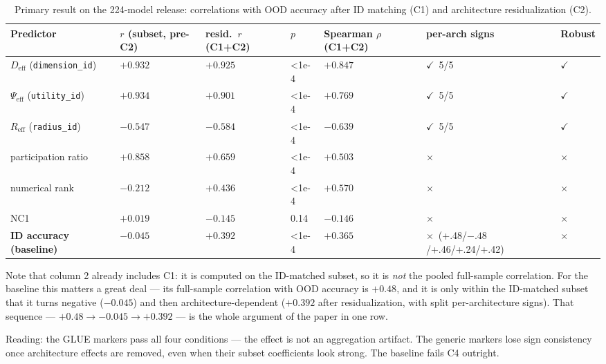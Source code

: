 \documentclass[10pt]{article} %
\newcommand{\okmark}{\ensuremath{\checkmark}}
\newcommand{\nomark}{\ensuremath{\times}}
\begin{document}
\begin{table}[t]
\caption{Primary result on the 224-model release: correlations with OOD accuracy after ID matching (C1) and architecture residualization (C2).}
\label{tab:primary}
\centering
\small
\setlength{\tabcolsep}{4pt}
\begin{tabular}{@{}p{3.05cm}p{1.75cm}p{1.75cm}p{0.90cm}p{2.35cm}p{3.75cm}p{1.25cm}@{}}
\hline
Predictor & $r$ (subset, pre-C2) & resid.\ $r$ (C1+C2) & $p$ & Spear\allowbreak man $\rho$ (C1+C2) & per-arch signs & Robust \\
\hline
$D_{\mathrm{eff}}$ (\texttt{dimension\_id}) & $+0.932$ & \textbf{$+0.925$} & <1e-4 & \textbf{$+0.847$} & \okmark\ 5/5 & \textbf{\okmark} \\
\hline
$\Psi_{\mathrm{eff}}$ (\texttt{utility\_id}) & $+0.934$ & \textbf{$+0.901$} & <1e-4 & $+0.769$ & \okmark\ 5/5 & \textbf{\okmark} \\
\hline
$R_{\mathrm{eff}}$ (\texttt{radius\_id}) & $-0.547$ & $-0.584$ & <1e-4 & $-0.639$ & \okmark\ 5/5 & \okmark \\
\hline
participation ratio & $+0.858$ & $+0.659$ & <1e-4 & $+0.503$ & \nomark & \nomark \\
\hline
numerical rank & $-0.212$ & $+0.436$ & <1e-4 & $+0.570$ & \nomark & \nomark \\
\hline
NC1 & $+0.019$ & $-0.145$ & 0.14 & $-0.146$ & \nomark & \nomark \\
\hline
\textbf{ID accuracy (baseline)} & $-0.045$ & $+0.392$ & <1e-4 & $+0.365$ & {\footnotesize\nomark\ (+.48/\allowbreak$-.48$/\allowbreak+.46/\allowbreak+.24/\allowbreak+.42)} & \nomark \\
\hline
\end{tabular}
\end{table}

Note that column 2 already includes C1: it is computed on the ID-matched subset, so it is \emph{not} the pooled full-sample correlation. For the baseline this matters a great deal --- its full-sample correlation with OOD accuracy is $+0.48$, and it is only within the ID-matched subset that it turns negative ($-0.045$) and then architecture-dependent ($+0.392$ after residualization, with split per-architecture signs). That sequence --- $+0.48 \rightarrow -0.045 \rightarrow +0.392$ --- is the whole argument of the paper in one row.

Reading: the GLUE markers pass all four conditions --- the effect is not an aggregation artifact. The generic markers lose sign consistency once architecture effects are removed, even when their subset coefficients look strong. The baseline fails C4 outright.
\end{document}
